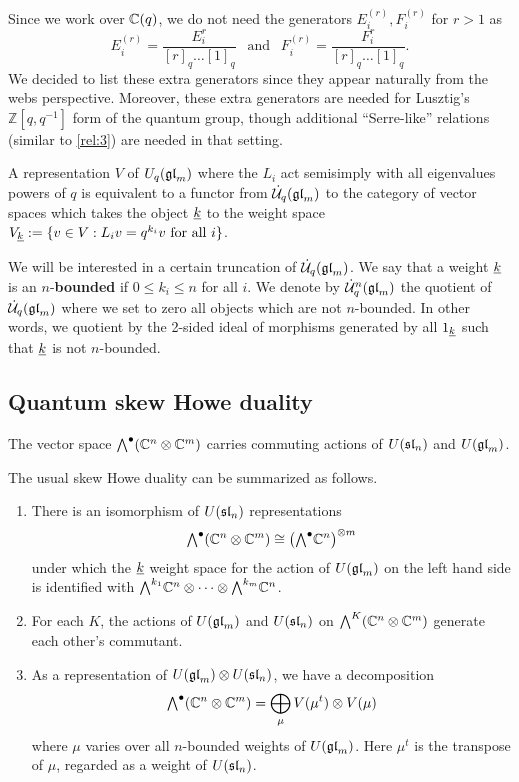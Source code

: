 \documentclass[11pt]{amsart}
\begin{document}
\begin{rem}
Since we work over $ \bC(q) $, we do not need the generators $ E_i^{(r)}, F_i^{(r)} $ for $ r > 1 $ as
$$E_i^{(r)} = \frac{E_i^r}{[r]_q \dots [1]_q} \ \ \text{ and } \ \ F_i^{(r)} = \frac{F_i^r}{[r]_q \dots [1]_q}.$$
We decided to list these extra generators since they appear naturally from the webs perspective.  Moreover, these extra generators are needed for Lusztig's $\mathbb{Z}[q,q^{-1}] $ form of the quantum group, though additional ``Serre-like'' relations (similar to \ref{rel:3}) are needed in that setting.
\end{rem}

A representation $ V $ of $ U_q(\gl_m) $ where the $ L_i $ act semisimply with all eigenvalues powers of $ q $ is equivalent to a functor from $ \dU(\gl_m) $ to the category of vector spaces which takes the object $ \ul{k} $ to the weight space $ V_{\ul{k}} := \{ v \in V : L_i v = q^{k_i} v \text{ for all } i \} $.

We will be interested in a certain truncation of $ \dU(\gl_m) $.  We say that a weight $ \ul{k} $ is an $n$-\textbf{bounded} if $ 0 \le k_i \le n $ for all $ i$.  We denote by $\dU^n(\gl_m)$ the quotient of $\dU(\gl_m)$ where we set to zero all objects which are not $n$-bounded. In other words, we quotient by the 2-sided ideal of morphisms generated by all $ \one_{\ul{k}} $ such that $ \ul{k} $ is not $ n$-bounded.

\subsection{Quantum skew Howe duality}\label{sec:quantumskew}

The vector space $\Alt{\bullet}{}(\mathbb C^n \otimes \mathbb C^m)$ carries commuting actions of $U(\sl_n)$ and $U(\gl_m)$.

\begin{thm}\mbox{}
The usual skew Howe duality \cite{MR986027,MR1321638} can be summarized as follows.
\begin{enumerate}
\item There is an isomorphism of $ U(\sl_n) $ representations
\begin{equation}
 \Alt{\bullet}{}(\mathbb C^n \otimes \mathbb C^m) \cong \left( \Alt{\bullet}{} \bC^n \right)^{\otimes m}
 \end{equation}
under which the $ \ul{k} $ weight space for the action of $ U(\gl_m) $ on the left hand side is identified with $\Alt{k_1}{} \mathbb C^n \otimes \cdots \otimes \Alt{k_m}{} \mathbb C^n$.
\item For each $ K $, the actions of $ U(\gl_m) $ and $ U(\sl_n) $ on $ \Alt{K}{}(\bC^n \otimes \bC^m) $ generate each other's commutant.
\item As a representation of $ U(\gl_m) \otimes U(\sl_n)$, we have a decomposition
$$ \Alt{\bullet}{} (\mathbb C^n \otimes \mathbb C^m) = \bigoplus_{\mu} V(\mu^t) \otimes V(\mu) $$
where $\mu$ varies over all $n$-bounded weights of $U(\gl_m)$. Here $\mu^t$ is the transpose of $\mu$, regarded as a weight of $U(\sl_n)$.
\end{enumerate}
\end{thm}
\end{document}
